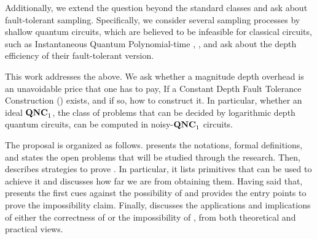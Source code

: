 \documentclass[manuscript,screen,review]{acmart}
\begin{document}
{%



%








\ifdefined\DEBUG
  
Additionally, we extend the question beyond the standard classes and ask about fault-tolerant sampling. Specifically, we consider several sampling processes by shallow quantum circuits, which are believed to be infeasible for classical circuits, such as Instantaneous Quantum Polynomial-time \cite{Bremner_2017}, \cite{Paletta_2024}, and ask about the depth efficiency of their fault-tolerant version.


 This work addresses the above. We ask whether a magnitude depth overhead is an unavoidable price that one has to pay, If a Constant Depth Fault Tolerance Construction (\CDO{}) exists, and if so, how to construct it. In particular, whether an ideal $\mathbf{QNC}_{1}{}$, the class of problems that can be decided by logarithmic depth quantum circuits, can be computed in noisy-$\mathbf{QNC}_{1}{}$ circuits. 

The proposal is organized as follows.  presents the notations, formal definitions, and states the open problems that will be studied through the research. Then,  describes strategies to prove \CDO{}. In particular, it lists primitives that can be used to achieve it and discusses how far we are from obtaining them. Having said that,  presents the first cues against the possibility of \CDO{} and provides the entry points to prove the impossibility claim. Finally,  discusses the applications and implications of either the correctness of \CDO{} or the impossibility of \CDO{}, from both theoretical and practical views.





}
\end{document}
